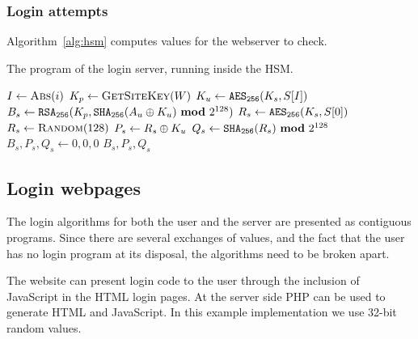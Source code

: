 \subsubsection{Login attempts}
Algorithm~\vref{alg:hsm} computes values for the webserver to check.
\nopagebreak
\begin{algorithm}[H]
\caption{The program of the login server, running inside the HSM.}
\label{alg:hsm}
\begin{algorithmic}[1]
\State $I\gets\Call{Abs}{i}$ 
\State $K_p\gets\Call{GetSiteKey}{W}$ 
\State $K_u\gets\texttt{\ensuremath{\mathtt{AES_{256}}}}(K_s,S[I])$	
\State $B_s\gets\texttt{\ensuremath{\mathtt{RSA_{256}}}}(K_p,\texttt{\ensuremath{\mathtt{SHA_{256}}}}(A_u\oplus K_u)\ \textbf{mod}\ 2^{128})$ 
\State $R_s\gets\texttt{\ensuremath{\mathtt{AES_{256}}}}(K_s,S[0])$
\Else{}
\State $R_s\gets\Call{Random}{128}$
\EndIf
\State $P_s\gets R_s\oplus K_u$
\State $Q_s\gets\texttt{\ensuremath{\mathtt{SHA_{256}}}}(R_s)\ \textbf{mod}\ 2^{128}$
\Else{}
\State $B_s,P_s,Q_s\gets0,0,0$
\EndIf
\State \Return $B_s, P_s, Q_s$
\EndProcedure
\end{algorithmic}
\end{algorithm}
\subsection{Login webpages}
The login algorithms for both the user and the server are presented as contiguous programs.
Since there are several exchanges of values,
and the fact that the user has no login program at its disposal,
the algorithms need to be broken apart.
\par
The website can present login code to the user through the inclusion of JavaScript in the HTML login pages.
At the server side PHP can be used to generate HTML and JavaScript.
In this example implementation we use 32-bit random values.
